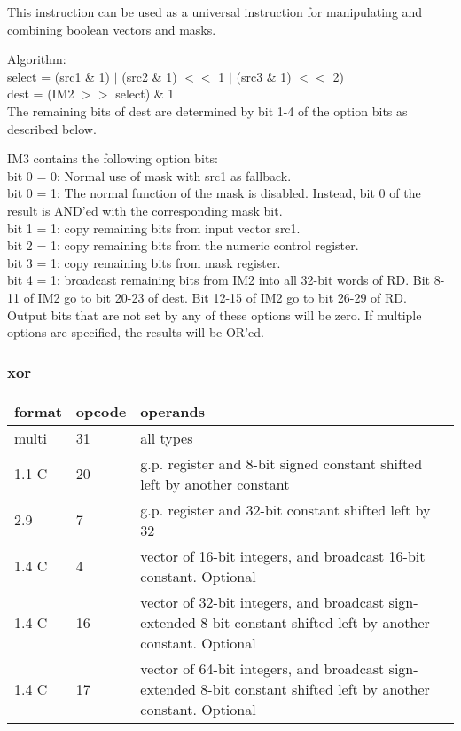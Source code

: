 \documentclass[forwardcom.tex]{subfiles}
\begin{document}
This instruction can be used as a universal instruction for manipulating and combining boolean vectors and masks.
\vspace{2mm}

Algorithm:\\
select = (src1 \& 1) $|$ (src2 \& 1) $<<$ 1 $|$ (src3 \& 1) $<<$ 2) \\
dest = (IM2 $>>$ select) \& 1 \\
The remaining bits of dest are determined by bit 1-4 of the option bits as described below.
\vspace{2mm}

IM3 contains the following option bits: \\
bit 0 = 0: Normal use of mask with src1 as fallback. \\
bit 0 = 1: The normal function of the mask is disabled. Instead, bit 0 of the result is AND'ed with the corresponding mask bit. \\
bit 1 = 1: copy remaining bits from input vector src1. \\
bit 2 = 1: copy remaining bits from the numeric control register. \\
bit 3 = 1: copy remaining bits from mask register. \\
bit 4 = 1: broadcast remaining bits from IM2 into all 32-bit words of RD. 
           Bit 8-11 of IM2 go to bit 20-23 of dest. Bit 12-15 of IM2 go to bit 26-29 of RD. \\
Output bits that are not set by any of these options will be zero. 
If multiple options are specified, the results will be OR'ed.


\subsubsection{xor}
\label{table:xorInstruction}
\begin{tabular}{|p{12mm}|p{12mm}|p{110mm}|}
\hline
\bfseries format & \bfseries opcode & \bfseries operands \\ \hline
multi & 31 & all types \\ \hline
1.1 C & 20 & g.p. register and 8-bit signed constant shifted left by another constant \\ \hline
2.9   &  7 & g.p. register and 32-bit constant shifted left by 32 \\ \hline
1.4 C &  4 & vector of 16-bit integers, and broadcast 16-bit constant. Optional \\ \hline
1.4 C & 16 & vector of 32-bit integers, and broadcast sign-extended 8-bit constant shifted left by another constant. Optional \\ \hline
1.4 C & 17 & vector of 64-bit integers, and broadcast sign-extended 8-bit constant shifted left by another constant. Optional \\ \hline
\end{tabular}
\vspace{2mm}
\end{document}
